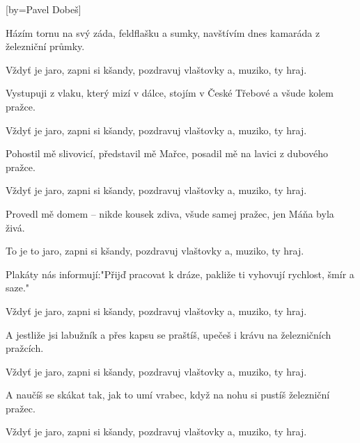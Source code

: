 [by={Pavel Dobeš}]

\beginverse{}
Házím tornu na svý záda, feldflašku a sumky,
navštívím dnes kamaráda z železniční průmky.
\endverse{}

\beginchorus{}
Vždyť je jaro, zapni si kšandy,
pozdravuj vlaštovky a, muziko, ty hraj.
\endchorus{}

\beginverse{}
Vystupuji z vlaku, který mizí v dálce,
stojím v České Třebové a všude kolem pražce.
\endverse{}

\beginchorus{}
Vždyť je jaro, zapni si kšandy,
pozdravuj vlaštovky a, muziko, ty hraj.
\endchorus{}

\beginverse{}
Pohostil mě slivovicí, představil mě Mařce,
posadil mě na lavici z dubového pražce.
\endverse{}

\beginchorus{}
Vždyť je jaro, zapni si kšandy,
pozdravuj vlaštovky a, muziko, ty hraj.
\endchorus{}

\beginverse{}
Provedl mě domem -- nikde kousek zdiva,
všude samej pražec, jen Máňa byla živá.
\endverse{}

\beginchorus{}
To je to jaro, zapni si kšandy,
pozdravuj vlaštovky a, muziko, ty hraj.
\endchorus{}

\beginverse{}
Plakáty nás informují:"Přijď pracovat k dráze,
pakliže ti vyhovují rychlost, šmír a saze."
\endverse{}

\beginchorus{}
Vždyť je jaro, zapni si kšandy,
pozdravuj vlaštovky a, muziko, ty hraj.
\endchorus{}

\beginverse{}
A jestliže jsi labužník a přes kapsu se praštíš,
upečeš i krávu na železničních pražcích.
\endverse{}

\beginchorus{}
Vždyť je jaro, zapni si kšandy,
pozdravuj vlaštovky a, muziko, ty hraj.
\endchorus{}

\beginverse{}
A naučíš se skákat tak, jak to umí vrabec,
když na nohu si pustíš železniční pražec.
\endverse{}

\beginchorus{}
Vždyť je jaro, zapni si kšandy,
pozdravuj vlaštovky a, muziko, ty hraj.
\endchorus{}

